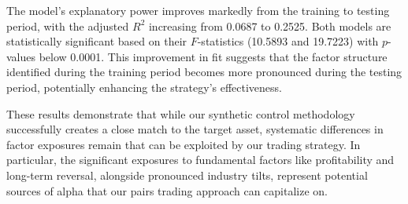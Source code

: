 
The model's explanatory power improves markedly from the training to testing period, with the adjusted $R^2$ increasing from 0.0687 to 0.2525. Both models are statistically significant based on their $F$-statistics (10.5893 and 19.7223) with $p$-values below 0.0001. This improvement in fit suggests that the factor structure identified during the training period becomes more pronounced during the testing period, potentially enhancing the strategy's effectiveness.

These results demonstrate that while our synthetic control methodology successfully creates a close match to the target asset, systematic differences in factor exposures remain that can be exploited by our trading strategy. In particular, the significant exposures to fundamental factors like profitability and long-term reversal, alongside pronounced industry tilts, represent potential sources of alpha that our pairs trading approach can capitalize on.